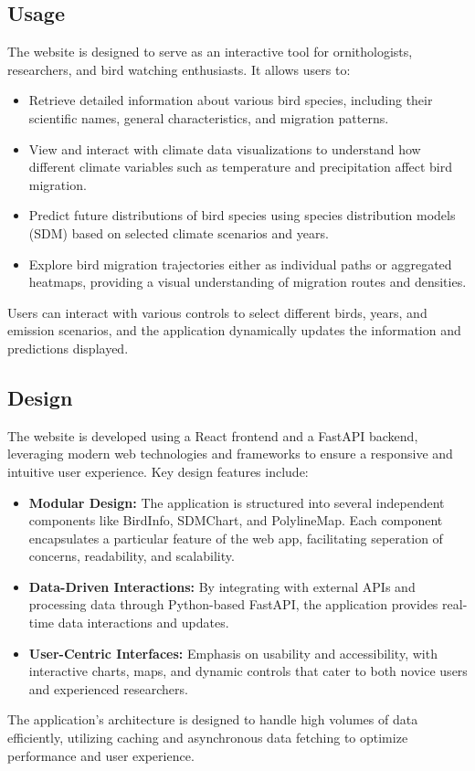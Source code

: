 \documentclass{article}
\begin{document}
\subsection{Usage}
The website is designed to serve as an interactive tool for ornithologists, researchers, and bird watching enthusiasts. It allows users to:

\begin{itemize}
    \item Retrieve detailed information about various bird species, including their scientific names, general characteristics, and migration patterns.
    \item View and interact with climate data visualizations to understand how different climate variables such as temperature and precipitation affect bird migration.
    \item Predict future distributions of bird species using species distribution models (SDM) based on selected climate scenarios and years.
    \item Explore bird migration trajectories either as individual paths or aggregated heatmaps, providing a visual understanding of migration routes and densities.
\end{itemize}

Users can interact with various controls to select different birds, years, and emission scenarios, and the application dynamically updates the information and predictions displayed.

\subsection{Design}
The website is developed using a React frontend and a FastAPI backend, leveraging modern web technologies and frameworks to ensure a responsive and intuitive user experience. Key design features include:

\begin{itemize}
    \item \textbf{Modular Design:} The application is structured into several independent components like BirdInfo, SDMChart, and PolylineMap. Each component encapsulates a particular feature of the web app, facilitating seperation of concerns, readability, and scalability.
    \item \textbf{Data-Driven Interactions:} By integrating with external APIs and processing data through Python-based FastAPI, the application provides real-time data interactions and updates.
    \item \textbf{User-Centric Interfaces:} Emphasis on usability and accessibility, with interactive charts, maps, and dynamic controls that cater to both novice users and experienced researchers.
\end{itemize}

The application's architecture is designed to handle high volumes of data efficiently, utilizing caching and asynchronous data fetching to optimize performance and user experience.
\end{document}
